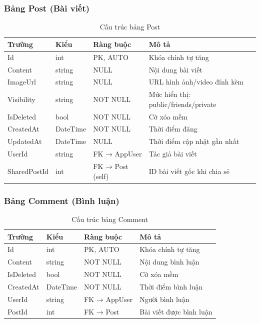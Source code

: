 \documentclass[a4paper]{article}
\begin{document}
\subsubsection{Bảng Post (Bài viết)}

\begin{table}[h!]
\centering
\caption{Cấu trúc bảng Post}
\begin{tabularx}{\textwidth}{|l|l|l|X|}
\hline
\textbf{Trường} & \textbf{Kiểu} & \textbf{Ràng buộc} & \textbf{Mô tả} \\
\hline
Id & int & PK, AUTO & Khóa chính tự tăng \\
\hline
Content & string & NULL & Nội dung bài viết \\
\hline
ImageUrl & string & NULL & URL hình ảnh/video đính kèm \\
\hline
Visibility & string & NOT NULL & Mức hiển thị: public/friends/private \\
\hline
IsDeleted & bool & NOT NULL & Cờ xóa mềm \\
\hline
CreatedAt & DateTime & NOT NULL & Thời điểm đăng \\
\hline
UpdatedAt & DateTime & NULL & Thời điểm cập nhật gần nhất \\
\hline
UserId & string & FK → AppUser & Tác giả bài viết \\
\hline
SharedPostId & int & FK → Post (self) & ID bài viết gốc khi chia sẻ \\
\hline
\end{tabularx}
\end{table}

\subsubsection{Bảng Comment (Bình luận)}

\begin{table}[h!]
\centering
\caption{Cấu trúc bảng Comment}
\begin{tabularx}{\textwidth}{|l|l|l|X|}
\hline
\textbf{Trường} & \textbf{Kiểu} & \textbf{Ràng buộc} & \textbf{Mô tả} \\
\hline
Id & int & PK, AUTO & Khóa chính tự tăng \\
\hline
Content & string & NOT NULL & Nội dung bình luận \\
\hline
IsDeleted & bool & NOT NULL & Cờ xóa mềm \\
\hline
CreatedAt & DateTime & NOT NULL & Thời điểm bình luận \\
\hline
UserId & string & FK → AppUser & Người bình luận \\
\hline
PostId & int & FK → Post & Bài viết được bình luận \\
\hline
\end{tabularx}
\end{table}
\end{document}
